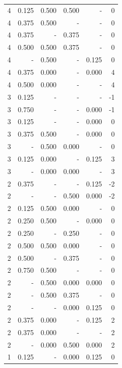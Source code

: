 \documentclass[a4paper]{article}\usepackage{graphicx, color}
\begin{document}
\begin{table}[ht]
\begin{tabular}{rrrrrr}
   \rowcolor{goodColor} 4 & 0.125 & 0.500 & 0.500 & - & 0 \\ 
  4 & 0.375 & 0.500 & - & - & 0 \\ 
   \rowcolor{sosoColor} 4 & 0.375 & - & 0.375 & - & 0 \\ 
  4 & 0.500 & 0.500 & 0.375 & - & 0 \\ 
  4 & - & 0.500 & - & 0.125 & 0 \\ 
  4 & 0.375 & 0.000 & - & 0.000 & 4 \\ 
  4 & 0.500 & 0.000 & - & - & 4 \\ 
   \rowcolor{nullColor} 3 & 0.125 & - & - & - & -1 \\ 
   \rowcolor{nullColor} 3 & 0.750 & - & - & 0.000 & -1 \\ 
   \rowcolor{nullColor} 3 & 0.125 & - & - & 0.000 & 0 \\ 
  3 & 0.375 & 0.500 & - & 0.000 & 0 \\ 
   \rowcolor{badColor} 3 & - & 0.500 & 0.000 & - & 0 \\ 
  3 & 0.125 & 0.000 & - & 0.125 & 3 \\ 
   \rowcolor{goodColor} 3 & - & 0.000 & 0.000 & - & 3 \\ 
   \rowcolor{nullColor} 2 & 0.375 & - & - & 0.125 & -2 \\ 
   \rowcolor{sosoColor} 2 & - & - & 0.500 & 0.000 & -2 \\ 
   \rowcolor{badColor} 2 & 0.125 & 0.500 & 0.000 & - & 0 \\ 
  2 & 0.250 & 0.500 & - & 0.000 & 0 \\ 
   \rowcolor{sosoColor} 2 & 0.250 & - & 0.250 & - & 0 \\ 
   \rowcolor{badColor} 2 & 0.500 & 0.500 & 0.000 & - & 0 \\ 
   \rowcolor{sosoColor} 2 & 0.500 & - & 0.375 & - & 0 \\ 
  2 & 0.750 & 0.500 & - & - & 0 \\ 
   \rowcolor{badColor} 2 & - & 0.500 & 0.000 & 0.000 & 0 \\ 
  2 & - & 0.500 & 0.375 & - & 0 \\ 
   \rowcolor{sosoColor} 2 & - & - & 0.000 & 0.125 & 0 \\ 
  2 & 0.375 & 0.000 & - & 0.125 & 2 \\ 
  2 & 0.375 & 0.000 & - & - & 2 \\ 
   \rowcolor{badColor} 2 & - & 0.000 & 0.500 & 0.000 & 2 \\ 
   \rowcolor{sosoColor} 1 & 0.125 & - & 0.000 & 0.125 & 0 \\ 

\end{tabular}
\end{table}
\end{document}
